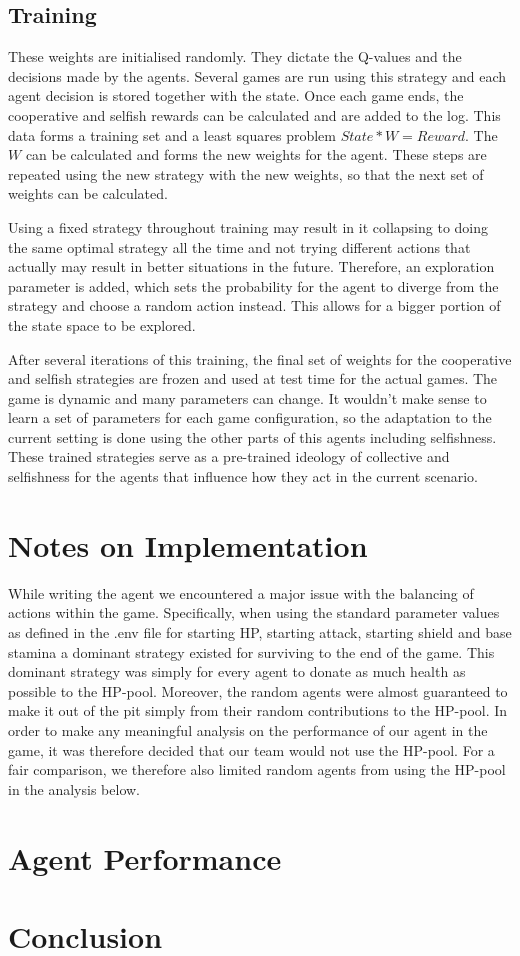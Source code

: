 \subsection{Training}
These weights are initialised randomly. They dictate the Q-values and the decisions made by the agents. Several games are run using this strategy and each agent decision is stored together with the state. Once each game ends, the cooperative and selfish rewards can be calculated and are added to the log. This data forms a training set and a least squares problem $State * W = Reward$. The $W$ can be calculated and forms the new weights for the agent. These steps are repeated using the new strategy with the new weights, so that the next set of weights can be calculated.

Using a fixed strategy throughout training may result in it collapsing to doing the same optimal strategy all the time and not trying different actions that actually may result in better situations in the future. Therefore, an exploration parameter is added, which sets the probability for the agent to diverge from the strategy and choose a random action instead. This allows for a bigger portion of the state space to be explored.

After several iterations of this training, the final set of weights for the cooperative and selfish strategies are frozen and used at test time for the actual games. The game is dynamic and many parameters can change. It wouldn't make sense to learn a set of parameters for each game configuration, so the adaptation to the current setting is done using the other parts of this agents including selfishness. These trained strategies serve as a pre-trained ideology of collective and selfishness for the agents that influence how they act in the current scenario.



\section{Notes on Implementation}

While writing the agent we encountered a major issue with the balancing of actions within the game. Specifically, when using the standard parameter values as defined in the .env file for starting HP, starting attack, starting shield and base stamina a dominant strategy existed for surviving to the end of the game. This dominant strategy was simply for every agent to donate as much health as possible to the HP-pool. Moreover, the random agents were almost guaranteed to make it out of the pit simply from their random contributions to the HP-pool. In order to make any meaningful analysis on the performance of our agent in the game, it was therefore decided that our team would not use the HP-pool. For a fair comparison, we therefore also limited random agents from using the HP-pool in the analysis below.

\section{Agent Performance}

\section{Conclusion}
